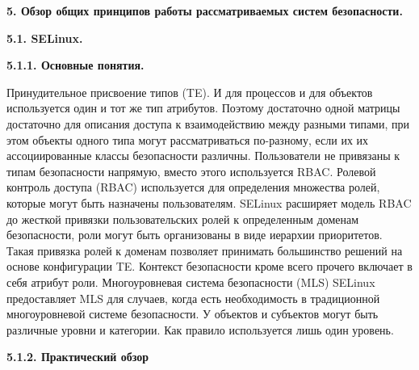 {\bfseries 5. Обзор общих принципов работы рассматриваемых систем 
безопасности.} 

\bigskip
{\bfseries 5.1. SELinux. }

\bigskip
{\bfseries 5.1.1. Основные понятия. }

Принудительное присвоение типов (TE). И для процессов и для объектов используется один и тот же тип атрибутов. Поэтому достаточно одной матрицы достаточно для описания доступа к взаимодействию между разными типами, при этом объекты одного типа могут рассматриваться по-разному, если их их ассоциированные классы безопасности различны. Пользователи не привязаны к типам безопасности напрямую, вместо этого используется RBAC. 
Ролевой контроль доступа (RBAC)  используется для определения множества ролей, которые могут быть назначены пользователям. SELinux расширяет модель RBAC до жесткой привязки пользовательских ролей к определенным доменам безопасности, роли могут быть организованы в виде иерархии приоритетов. Такая привязка ролей к доменам позволяет принимать большинство решений на основе конфигурации TE. Контекст безопасности кроме всего прочего включает в себя атрибут роли. 
Многоуровневая система безопасности (MLS) SELinux предоставляет MLS для случаев, когда есть необходимость в традиционной многоуровневой системе безопасности. У объектов и субъектов могут быть различные уровни и категории. Как правило используется лишь один уровень. 

\bigskip
{\bfseries 5.1.2. Практический обзор }

